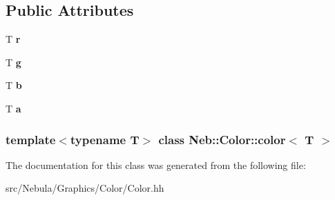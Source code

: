 \subsection*{\-Public \-Attributes}
\begin{DoxyCompactItemize}
\item 
\hypertarget{classNeb_1_1Color_1_1color_a8a18346bc363bf76e839492605e0a1f4}{\-T {\bfseries r}}\label{classNeb_1_1Color_1_1color_a8a18346bc363bf76e839492605e0a1f4}

\item 
\hypertarget{classNeb_1_1Color_1_1color_a681638c1b8b3e75508c654c3b356d07c}{\-T {\bfseries g}}\label{classNeb_1_1Color_1_1color_a681638c1b8b3e75508c654c3b356d07c}

\item 
\hypertarget{classNeb_1_1Color_1_1color_a7db460b59724724bbe4d1696a72bb3dc}{\-T {\bfseries b}}\label{classNeb_1_1Color_1_1color_a7db460b59724724bbe4d1696a72bb3dc}

\item 
\hypertarget{classNeb_1_1Color_1_1color_ad30391f20a88d4ea5be687113821be7e}{\-T {\bfseries a}}\label{classNeb_1_1Color_1_1color_ad30391f20a88d4ea5be687113821be7e}

\end{DoxyCompactItemize}
\subsubsection*{template$<$typename \-T$>$ class Neb\-::\-Color\-::color$<$ T $>$}



\-The documentation for this class was generated from the following file\-:\begin{DoxyCompactItemize}
\item 
src/\-Nebula/\-Graphics/\-Color/\-Color.\-hh\end{DoxyCompactItemize}
